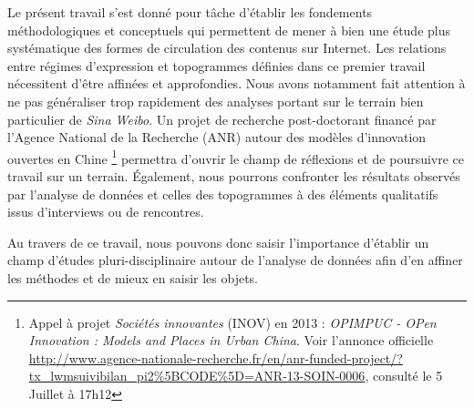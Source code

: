 Le présent travail s'est donné pour tâche d'établir les fondements méthodologiques et conceptuels qui permettent de mener à bien une étude plus systématique des formes de circulation des contenus sur Internet. Les relations entre régimes d'expression et topogrammes définies dans ce premier travail nécessitent d'être affinées et approfondies. Nous avons notamment fait attention à ne pas généraliser trop rapidement des analyses portant sur le terrain bien particulier de \textit{Sina Weibo}. Un projet de recherche post-doctorant financé par l'Agence National de la Recherche (ANR) autour des modèles d'innovation ouvertes en Chine
\footnote{
    Appel à projet \textit{Sociétés innovantes} (INOV) en 2013 : \textit{OPIMPUC - OPen Innovation : Models and Places in Urban China}. Voir l'annonce officielle \url{http://www.agence-nationale-recherche.fr/en/anr-funded-project/?tx_lwmsuivibilan_pi2\%5BCODE\%5D=ANR-13-SOIN-0006}, consulté le 5 Juillet à 17h12
} permettra d'ouvrir le champ de réflexions et de poursuivre ce travail sur un terrain. Également, nous pourrons confronter les résultats observés par l'analyse de données et celles des topogrammes à des éléments qualitatifs issus d'interviews ou de rencontres. 

Au travers de ce travail, nous pouvons donc saisir l'importance d'établir un champ d'études pluri-disciplinaire autour de l'analyse de données afin d'en affiner les méthodes et de mieux en saisir les objets.
